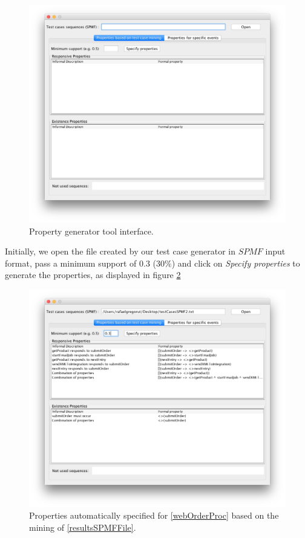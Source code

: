 \begin{figure}[htb]
\centering
\includegraphics[width=\textwidth]{figuras/propGenClean}
\caption{\label{propGenClean} Property generator tool interface.}
\end{figure}

Initially, we open the file created by our test case generator in $SPMF$ input format, pass a minimum support of 0.3 ($30\%$) and click on \textit{Specify properties} to generate the properties, as displayed in figure \ref{propGenMining}

\begin{figure}[htb]
\centering
\includegraphics[width=\textwidth]{figuras/propGenMining}
\caption{\label{propGenMining} Properties automatically specified for \ref{webOrderProc} based on the mining of \ref{resultsSPMFFile}.}
\end{figure}

